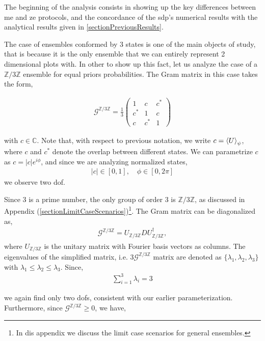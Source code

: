 \documentclass[12pt,letterpaper]{article}
\begin{document}
\hspace{20pt}The beginning of the analysis consists in showing up the key differences between \gls{me} and \gls{ze} protocols, and the concordance of the \gls{sdp}'s numerical results with the analytical results given in \ref{sectionPreviousResults}.

The case of ensembles conformed by 3 states is one of the main objects of study, that is because it is the only ensemble that we can entirely represent 2 dimensional plots with. In other to show up this fact, let us analyze the case of a $\mathbb{Z}/3\mathbb{Z}$ ensemble for equal priors probabilities. The Gram matrix in this case takes the form,

\begin{align*}
	\mathcal{G}^{\mathbb{Z}/3\mathbb{Z}}=\frac{1}{3}\begin{pmatrix}
		1 & c & c^*\\
		c^* & 1 & c\\
		c & c^* & 1
	\end{pmatrix}
\end{align*}

with $c \in \mathbb{C}$. Note that, with respect to previous notation, we write $c = \braket{U}_{\psi}$, where $c$ and $c^*$ denote the overlap between different states. We can parametrize $c$ as $c = |c|e^{i\phi}$, and since we are analyzing normalized states,
\begin{align*}
	|c|\in [0,1], \quad \phi\in[0,2\pi]
\end{align*}
we observe two \gls{dof}.

Since 3 is a prime number, the only group of order 3 is $\mathbb{Z}/3\mathbb{Z}$, as discussed in Appendix (\ref{sectionLimitCaseScenarios})\footnote{In dis appendix we discuss the limit case scenarios for general ensembles.}. The Gram matrix can be diagonalized as,
\begin{align*}
	\mathcal{G}^{\mathbb{Z}/3\mathbb{Z}} = U_{\mathbb{Z}/3\mathbb{Z}} D U_{\mathbb{Z}/3\mathbb{Z}}^\dagger,
\end{align*}
where $U_{\mathbb{Z}/3\mathbb{Z}}$ is the unitary matrix with Fourier basis vectors as columns. The eigenvalues of the simplified matrix, i.e. $3\mathcal{G}^{\mathbb{Z}/3\mathbb{Z}}$ matrix are denoted as $\{\lambda_1,\lambda_2,\lambda_3\}$ with $\lambda_1 \leq \lambda_2 \leq \lambda_3$. Since,
\begin{align*}
	\sum_{i=1}^3 \lambda_i = 3
\end{align*}

we again find only two \glspl{dof}, consistent with our earlier parameterization. Furthermore, since $\mathcal{G}^{\mathbb{Z}/3\mathbb{Z}} \geq 0$, we have,
\end{document}
